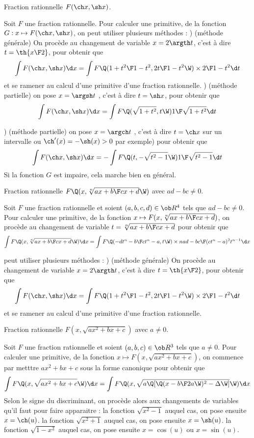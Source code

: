 \Concept [Index=Primitives!des fonctions du type@des fonctions du type $F(\ch x,\sh x)$] Fraction rationnelle $F(\ch x,\sh x)$. 

\Propriete []  Soit $F$ une fraction rationnelle. Pour calculer une primitive, de la fonction $G:x\mapsto F(\ch x,\sh x)$, on peut utiliser plusieurs m\'ethodes : ) (m\'ethode g\'en\'erale) On proc\`ede au changement de variable $x=2\argth t$, c'est \`a dire $t=\th{x\F2}$, pour obtenir que 
$$
\int F(\ch x,\sh x)\d x=\int F\Q({1+t^2\F1-t^2},{2t\F 1-t^2}\W)\times{2\F1-t^2}\d t
$$
et se ramener au calcul d'une primitive d'une fraction rationnelle. 
\medskip
{}) (m\'ethode partielle) on pose $x=\argsh t$ , c'est \`a dire $t=\sh x$, pour obtenir que 
$$
\int F(\ch x,\sh x)\d x=\int F\Q(\sqrt{1+t^2},t\W){1\F\sqrt{1+t^2}}\d t
$$

\medskip
{}) (m\'ethode partielle) on pose $x=\argch t$ , c'est \`a dire $t=\ch x$ sur un intervalle ou $\ch'(x)=-\sh(x)> 0$ par exemple) pour obtenir que 
$$
\int F(\ch x,\sh x)\d x=-\int F\Q(t,-\sqrt{t^2-1}\W){1\F\sqrt{t^2-1}}\d t
$$
Si la fonction $G$ est impaire, cela marche bien en g\'en\'eral. 



\Concept [Index=Primitives!des fonctions du type@des fonctions du type $F\Q(x,\root n\of{ax+b \F cx+d}\W)$] Fraction rationnelle $F\Q(x,\root n\of{ax+b \F cx+d}\W)$ avec $ad-bc\neq0$. 

\Propriete []  Soit $F$ une fraction rationnelle et soient $(a,b,c,d)\in\ob R^4$ tels que $ad-bc\neq0$. 
Pour calculer une primitive, de la fonction $x\mapsto F(x, \root n\of{ax+b \F cx+d})$, on proc\`ede au changement de variable 
$t=\root n\of{ax+b \F cx+d}$ pour obtenir que 
$$
\int F\Q(x, \root n\of{ax+b \F cx+d}\W)\d x=\int F\Q(-{dt^n-b\F ct^n-a}, t\W)\times n{ad-bc\F(ct^n-a)^2}t^{n-1}\d x
$$

peut utiliser plusieurs m\'ethodes : ) (m\'ethode g\'en\'erale) On proc\`ede au changement de variable $x=2\argth t$, c'est \`a dire $t=\th{x\F2}$, pour obtenir que 
$$
\int F(\ch x,\sh x)\d x=\int F\Q({1+t^2\F1-t^2},{2t\F 1-t^2}\W)\times{2\F1-t^2}\d t
$$
et se ramener au calcul d'une primitive d'une fraction rationnelle. 



\Concept [Index=Primitives!des fonctions du type@des fonctions du type $F(x, \sqrt{ax^2+bx+c})$]  Fraction rationnelle $F(x, \sqrt{ax^2+bx+c})$ avec $a\neq0$. 

\Propriete []  Soit $F$ une fraction rationnelle et soient $(a,b,c)\in\ob R^3$ tels que $a\neq0$. 
Pour calculer une primitive, de la fonction $x\mapsto F(x, \sqrt{ax^2+bx+c})$, on commence par metttre $ax^2+bx+c$ sous la forme canonique pour obtenir que 
$$
\int F\Q(x,\sqrt{ax^2+bx+c}\W)\d x=\int F\Q(x, \sqrt{a\Q[\Q(x-{b\F2a}\W)^2-\Delta\W]}\W)\d x
$$
Selon le signe du discriminant, on proc\`ede alors aux changements de variables qu'il faut pour faire apparaitre : \pn
la fonction $\sqrt{x^2-1}$ auquel cas, on pose ensuite $x=\ch(u)$. \pn
la fonction $\sqrt{x^2+1}$ auquel cas, on pose ensuite $x=\sh(u)$. \pn
la fonction $\sqrt{1-x^2}$ auquel cas, on pose ensuite $x=\cos(u)$ ou $x=\sin(u)$. 
\bigskip

